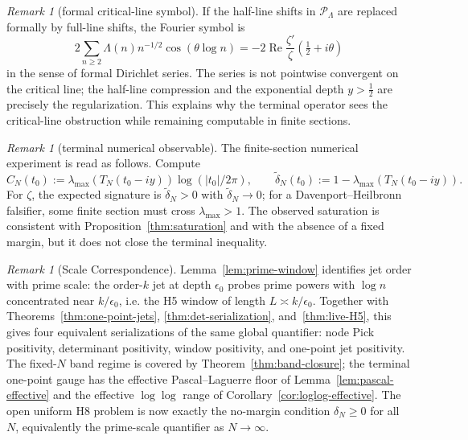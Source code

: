 \documentclass[11pt]{amsart}
\theoremstyle{definition}
\theoremstyle{remark}
\newtheorem{remark}[theorem]{Remark}
\theoremstyle{definition}
\renewcommand{\Re}{\operatorname{Re}}
\newcommand{\half}{\tfrac{1}{2}}
\begin{document}
\begin{remark}[formal critical-line symbol]\label{rmk:critical-symbol}
If the half-line shifts in $\mathcal P_\Lambda$ are replaced formally by full-line shifts, the Fourier
symbol is
\[
   2\sum_{n\ge2}\Lambda(n)n^{-1/2}\cos(\theta\log n)
   =
   -2\Re\frac{\zeta'}{\zeta}\!\left(\half+i\theta\right)
\]
in the sense of formal Dirichlet series.  The series is not pointwise convergent on the critical line;
the half-line compression and the exponential depth $y>\half$ are precisely the regularization.  This
explains why the terminal operator sees the critical-line obstruction while remaining computable in
finite sections.
\end{remark}

\begin{remark}[terminal numerical observable]\label{rmk:terminal-numerics}
The finite-section numerical experiment is read as follows.  Compute
\[
   C_N(t_0):=\lambda_{\max}(T_N(t_0-iy))\log(|t_0|/2\pi),
   \qquad
   \tilde\delta_N(t_0):=1-\lambda_{\max}(T_N(t_0-iy)).
\]
For $\zeta$, the expected signature is $\tilde\delta_N>0$ with $\tilde\delta_N\to0$; for a
Davenport--Heilbronn falsifier, some finite section must cross $\lambda_{\max}>1$.  The observed
saturation is consistent with Proposition~\ref{thm:saturation} and with the absence of a fixed margin,
but it does not close the terminal inequality.
\end{remark}

\begin{remark}[Scale Correspondence]\label{rmk:scale-correspondence}
Lemma~\ref{lem:prime-window} identifies jet order with prime scale: the order-$k$ jet at depth
$\epsilon_0$ probes prime powers with $\log n$ concentrated near $k/\epsilon_0$, i.e. the H5 window of
length $L\asymp k/\epsilon_0$.  Together with Theorems~\ref{thm:one-point-jets},
\ref{thm:det-serialization}, and~\ref{thm:live-H5}, this gives four equivalent serializations of the
same global quantifier: node Pick positivity, determinant positivity, window positivity, and one-point
jet positivity.  The fixed-$N$ band regime is covered by Theorem~\ref{thm:band-closure}; the terminal
one-point gauge has the effective Pascal--Laguerre floor of Lemma~\ref{lem:pascal-effective} and the
effective $\log\log$ range of Corollary~\ref{cor:loglog-effective}.  The open uniform H8 problem is now
exactly the no-margin condition $\delta_N\ge0$ for all $N$, equivalently the prime-scale quantifier as
$N\to\infty$.
\end{remark}
\end{document}
